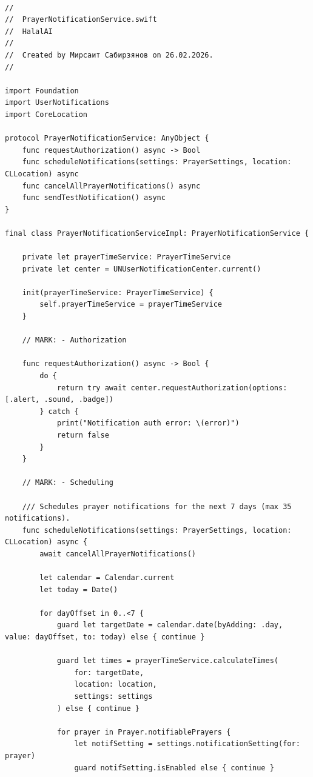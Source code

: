 \begin{lstlisting}[basicstyle=\tiny\ttfamily,breaklines=true]

//
//  PrayerNotificationService.swift
//  HalalAI
//
//  Created by Мирсаит Сабирзянов on 26.02.2026.
//

import Foundation
import UserNotifications
import CoreLocation

protocol PrayerNotificationService: AnyObject {
    func requestAuthorization() async -> Bool
    func scheduleNotifications(settings: PrayerSettings, location: CLLocation) async
    func cancelAllPrayerNotifications() async
    func sendTestNotification() async
}

final class PrayerNotificationServiceImpl: PrayerNotificationService {

    private let prayerTimeService: PrayerTimeService
    private let center = UNUserNotificationCenter.current()

    init(prayerTimeService: PrayerTimeService) {
        self.prayerTimeService = prayerTimeService
    }

    // MARK: - Authorization

    func requestAuthorization() async -> Bool {
        do {
            return try await center.requestAuthorization(options: [.alert, .sound, .badge])
        } catch {
            print("Notification auth error: \(error)")
            return false
        }
    }

    // MARK: - Scheduling

    /// Schedules prayer notifications for the next 7 days (max 35 notifications).
    func scheduleNotifications(settings: PrayerSettings, location: CLLocation) async {
        await cancelAllPrayerNotifications()

        let calendar = Calendar.current
        let today = Date()

        for dayOffset in 0..<7 {
            guard let targetDate = calendar.date(byAdding: .day, value: dayOffset, to: today) else { continue }

            guard let times = prayerTimeService.calculateTimes(
                for: targetDate,
                location: location,
                settings: settings
            ) else { continue }

            for prayer in Prayer.notifiablePrayers {
                let notifSetting = settings.notificationSetting(for: prayer)
                guard notifSetting.isEnabled else { continue }


\end{lstlisting}
